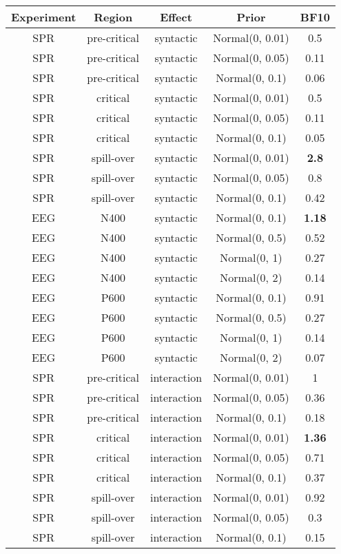 \documentclass[12pt]{article}
\begin{document}
\begin{table}[h]
    \centering
    \begin{tabular}{ccccc}
\toprule
Experiment &      Region   &   Effect  &         Prior & BF10\\
\midrule
SPR & pre-critical&   syntactic &Normal(0, 0.01)&0.5\\
SPR & pre-critical&   syntactic &Normal(0, 0.05)& 0.11\\
SPR & pre-critical&   syntactic  &Normal(0, 0.1)& 0.06\\
SPR & critical   &syntactic &Normal(0, 0.01)&0.5\\
SPR & critical   &syntactic &Normal(0, 0.05)& 0.11\\
SPR & critical   &syntactic  &Normal(0, 0.1)&0.05\\
SPR & spill-over  & syntactic &Normal(0, 0.01)& \textbf{2.8}\\
SPR & spill-over  & syntactic &Normal(0, 0.05)& 0.8\\
SPR & spill-over  & syntactic  &Normal(0, 0.1)&0.42\\

EEG & N400   &syntactic &Normal(0, 0.1)&\textbf{1.18}\\
EEG & N400   &syntactic &Normal(0, 0.5)&0.52\\
EEG &  N400  & syntactic &  Normal(0, 1)&0.27\\
EEG & N400   &syntactic  & Normal(0, 2)&0.14\\
EEG & P600  & syntactic &Normal(0, 0.1) & 0.91\\
EEG & P600  & syntactic &Normal(0, 0.5) &0.27\\
EEG &  P600 &  syntactic &  Normal(0, 1)&0.14\\
EEG & P600  & syntactic  & Normal(0, 2) & 0.07\\

SPR & pre-critical &interaction &Normal(0, 0.01) & 1\\
SPR & pre-critical &interaction &Normal(0, 0.05) & 0.36\\
SPR & pre-critical &interaction & Normal(0, 0.1) & 0.18\\
SPR & critical &interaction &Normal(0, 0.01) & \textbf{1.36}\\
SPR & critical &interaction &Normal(0, 0.05) & 0.71\\
SPR & critical &interaction & Normal(0, 0.1) & 0.37\\
SPR & spill-over& interaction& Normal(0, 0.01) &0.92\\
SPR & spill-over &interaction &Normal(0, 0.05) & 0.3\\
SPR & spill-over &interaction  &Normal(0, 0.1) & 0.15\\  


\end{tabular}
\end{table}
\end{document}
